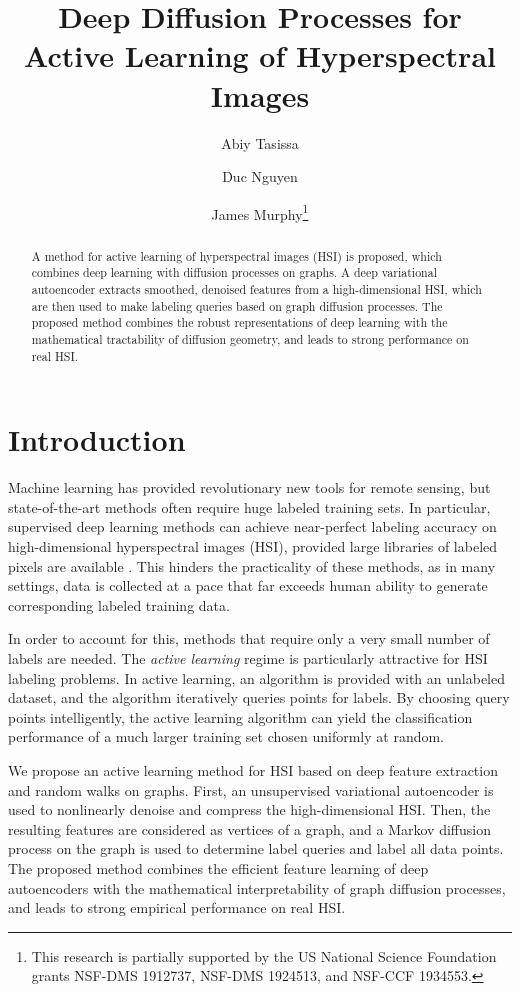 \documentclass{article}
\title{Deep Diffusion Processes for Active Learning of Hyperspectral Images}
\author[1]{Abiy Tasissa}
\author[2]{Duc Nguyen}
\author[1]{James Murphy\thanks{This research is partially supported by the US National Science Foundation grants NSF-DMS 1912737, NSF-DMS 1924513, and NSF-CCF 1934553.}}
\affil[2]{Department of Mathematics, University of Maryland, College Park, USA}
\affil[1]{Department of Mathematics, Tufts University, Medford, MA}
\begin{document}
\maketitle

\begin{abstract} A method for active learning of hyperspectral images (HSI) is proposed, which combines deep learning with diffusion processes on graphs.  A deep variational autoencoder extracts smoothed, denoised features from a high-dimensional HSI, which are then used to make labeling queries based on graph diffusion processes.  The proposed method combines the robust representations of deep learning with the mathematical tractability of diffusion geometry, and leads to strong performance on real HSI.  

\end{abstract}


\section{Introduction}
\label{sec:Introduction}
 
 Machine learning has provided revolutionary new tools for remote sensing, but state-of-the-art methods often require huge labeled training sets.  In particular, supervised deep learning methods can achieve near-perfect labeling accuracy on high-dimensional hyperspectral images (HSI), provided large libraries of labeled pixels are available \cite{Zhu2017_Deep}.  This hinders the practicality of these methods, as in many settings, data is collected at a pace that far exceeds human ability to generate corresponding labeled training data.
 
 In order to account for this, methods that require only a very small number of labels are needed.  The \emph{active learning} regime is particularly attractive for HSI labeling problems.  In active learning, an algorithm is provided with an unlabeled dataset, and the algorithm iteratively queries points for labels.  By choosing query points intelligently, the active learning algorithm can yield the classification performance of a much larger training set chosen uniformly at random.  
 
We propose an active learning method for HSI based on deep feature extraction and random walks on graphs.  First, an unsupervised variational autoencoder is used to nonlinearly denoise and compress the high-dimensional HSI.  Then, the resulting features are considered as vertices of a graph, and a Markov diffusion process on the graph is used to determine label queries and label all data points.  The proposed method combines the efficient feature learning of deep autoencoders with the mathematical interpretability of graph diffusion processes, and leads to strong empirical performance on real HSI.  
\end{document}

